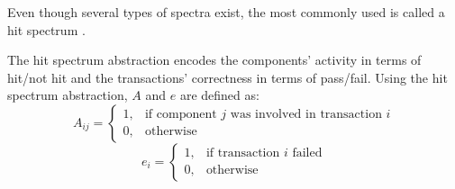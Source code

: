 Even though several types of spectra exist, the most commonly used is
called a hit spectrum \cite{Harrold98,Yilmaz08,Santelices09}.
%
\begin{definition}
  \label{def:intro:hit-spectrum}
  The hit spectrum abstraction encodes the components' activity in terms
  of hit/not hit and the transactions' correctness in terms of
  pass/fail.
  Using the hit spectrum abstraction, $A$ and $e$ are defined as:
  \begin{equation}
    A_{ij} = \begin{cases}
      1, & \textrm{if component $j$ was involved in transaction $i$}\\
      0, & \textrm{otherwise}
    \end{cases}
  \end{equation}
  \begin{equation}
    e_{i} = \begin{cases}
      1, & \textrm{if transaction $i$ failed}\\
      0, & \textrm{otherwise}
    \end{cases}
  \end{equation}
\end{definition}

